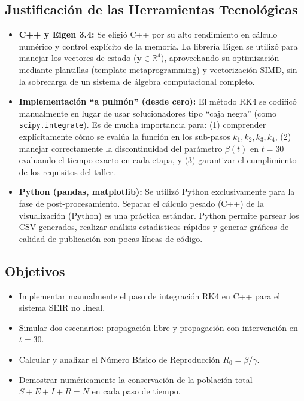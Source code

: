 \documentclass[12pt,a4paper]{article}
\theoremstyle{definition}
\newcommand{\R}{\mathbb{R}}
\newcommand{\vect}[1]{\mathbf{#1}}
\begin{document}
\subsection{Justificaci\'{o}n de las Herramientas Tecnol\'{o}gicas}

\begin{itemize}
    \item \textbf{C++ y Eigen 3.4:} Se eligi\'{o} C++ por su alto rendimiento en c\'{a}lculo num\'{e}rico y control expl\'{i}cito de la memoria. La librer\'{i}a Eigen se utiliz\'{o} para manejar los vectores de estado ($\vect{y} \in \R^4$), aprovechando su optimizaci\'{o}n mediante plantillas (template metaprogramming) y vectorizaci\'{o}n SIMD, sin la sobrecarga de un sistema de \'algebra computacional completo.
    \item \textbf{Implementaci\'{o}n ``a pulm\'{o}n'' (desde cero):} El m\'{e}todo RK4 se codific\'{o} manualmente en lugar de usar solucionadores tipo ``caja negra'' (como \texttt{scipy.integrate}). Es de mucha importancia para: (1) comprender expl\'{i}citamente c\'{o}mo se eval\'{u}a la funci\'{o}n en los sub-pasos $k_1, k_2, k_3, k_4$, (2) manejar correctamente la discontinuidad del par\'{a}metro $\beta(t)$ en $t=30$ evaluando el tiempo exacto en cada etapa, y (3) garantizar el cumplimiento de los requisitos del taller.
    \item \textbf{Python (pandas, matplotlib):} Se utiliz\'{o} Python exclusivamente para la fase de post-procesamiento. Separar el c\'{a}lculo pesado (C++) de la visualizaci\'{o}n (Python) es una pr\'{a}ctica est\'{a}ndar. Python permite parsear los CSV generados, realizar an\'{a}lisis estad\'{i}sticos r\'{a}pidos y generar gr\'{a}ficas de calidad de publicaci\'{o}n con pocas l\'{i}neas de c\'{o}digo.
\end{itemize}

\subsection{Objetivos}
\begin{itemize}
    \item Implementar manualmente el paso de integraci\'{o}n RK4 en C++ para el sistema SEIR no lineal.
    \item Simular dos escenarios: propagaci\'{o}n libre y propagaci\'{o}n con intervenci\'{o}n en $t=30$.
    \item Calcular y analizar el N\'{u}mero B\'{a}sico de Reproducci\'{o}n $R_0 = \beta/\gamma$.
    \item Demostrar num\'{e}ricamente la conservaci\'{o}n de la poblaci\'{o}n total $S+E+I+R = N$ en cada paso de tiempo.
\end{itemize}
\end{document}
